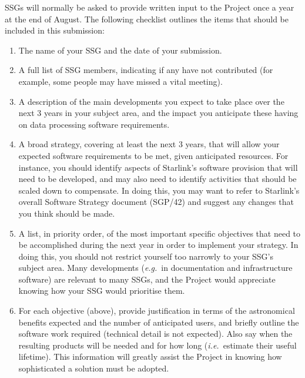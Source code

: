 \documentclass[twoside,11pt]{article}
\newcommand{\xref}[3]{#1}
\begin{document}
SSGs will normally be asked to provide written input to the Project
once a year at the end of August. The following checklist outlines the
items that should be included in this submission:

\begin{enumerate}
\item The name of your SSG and the date of your submission.

\item A full list of SSG members, indicating if any have not
contributed (for example, some people may have missed a vital
meeting).

\item A description of the main developments you expect to take place
over the next 3 years in your subject area, and the impact you
anticipate these having on data processing software requirements.

\item A broad strategy, covering at least the next 3 years, that will
allow your expected software requirements to be met, given anticipated
resources. For instance, you should identify aspects of Starlink's
software provision that will need to be developed, and may also need
to identify activities that should be scaled down to compensate. In
doing this, you may want to refer to Starlink's overall Software
Strategy document (\xref{SGP/42}{sgp42}{}) and suggest any changes
that you think should be made.

\item A list, in priority order, of the most important specific
objectives that need to be accomplished during the next year in order
to implement your strategy. In doing this, you should not restrict
yourself too narrowly to your SSG's subject area. Many developments
({\em e.g.}\ in documentation and infrastructure software) are
relevant to many SSGs, and the Project would appreciate knowing how
your SSG would prioritise them.

\item For each objective (above), provide justification in terms of
the astronomical benefits expected and the number of anticipated
users, and briefly outline the software work required (technical
detail is not expected). Also say when the resulting products will be
needed and for how long ({\em i.e.}\ estimate their useful
lifetime). This information will greatly assist the Project in knowing
how sophisticated a solution must be adopted.

\end{enumerate}
\end{document}
